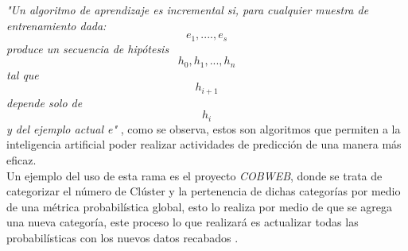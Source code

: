 		
		            
                   
        
            \textit{"Un algoritmo de aprendizaje es incremental si,
            para cualquier muestra de entrenamiento dada:
            \begin{equation*}
                e_{1} , .... , e_{s}
			\end{equation*}
            produce un secuencia de hipótesis 
            \begin{equation*}
                h_{0} , h_{1}, . . . , h_{n} 
            \end{equation*}
            tal que \[ h_{i+1} \] depende solo de \[ h_i \] y del ejemplo actual e"} \cite{GiraudCarrier2000}, como se 
            observa, estos son algoritmos que permiten a la inteligencia artificial poder realizar actividades de predicci\'on 
            de una manera m\'as eficaz.\\
            
            Un ejemplo del uso de esta rama es el proyecto \textit{COBWEB}, donde se trata de categorizar el n\'umero de Cl\'uster y la pertenencia 
            de dichas categor\'ias por medio de una m\'etrica probabil\'istica global, esto lo realiza por medio de que se agrega 
            una nueva categor\'ia, este proceso lo que realizar\'a es actualizar todas las probabil\'isticas con los nuevos datos recabados \cite{fisher1987}.

